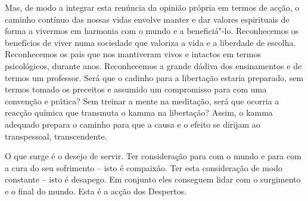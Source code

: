 Mas, de modo a integrar esta renúncia da opinião própria em termos de acção, o
caminho contínuo das nossas vidas envolve manter e dar valores espirituais de
forma a vivermos em harmonia com o mundo e a beneficiá"-lo. Reconhecemos os
benefícios de viver numa sociedade que valoriza a vida e a liberdade de escolha.
Reconhecemos os pais que nos mantiveram vivos e intactos em termos psicológicos,
durante anos. Reconhecemos a grande dádiva dos ensinamentos e de termos um
professor. Será que o cadinho para a libertação estaria preparado, sem termos
tomado os preceitos e assumido um compromisso para com uma convenção e prática?
Sem treinar a mente na meditação, será que ocorria a reacção química que
transmuta o kamma na libertação? Assim, o kamma adequado prepara o caminho para
que a causa e o efeito se dirijam ao transpessoal, transcendente.

O que surge é o desejo de servir. Ter consideração para com o mundo e para com a
cura do seu sofrimento -- isto é compaixão. Ter esta consideração de modo
constante -- isto é desapego. Em conjunto eles conseguem lidar com o surgimento
e o final do mundo. Esta é a acção dos Despertos.
